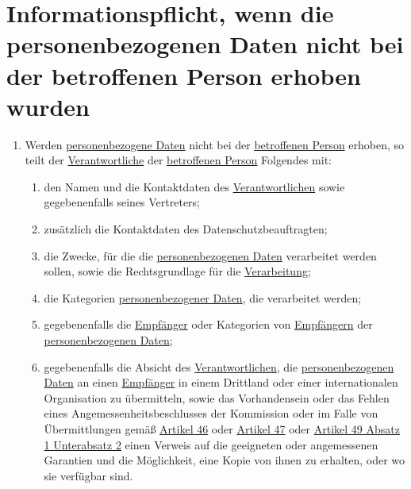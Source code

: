 \chapter{Informationspflicht, wenn die personenbezogenen Daten nicht bei der betroffenen Person erhoben wurden}
\label{ch:14}


\begin{enumerate}

  \item Werden \hyperref[itm:04-1]{personenbezogene Daten} nicht bei der \hyperref[itm:04-1]{betroffenen Person} erhoben, so teilt der \hyperref[itm:04-7]{Verantwortliche} der
   \hyperref[itm:04-1]{betroffenen Person} Folgendes mit:
  \label{itm:14-1}

  \begin{enumerate}
  
    \item den Namen und die Kontaktdaten des \hyperref[itm:04-7]{Verantwortlichen} sowie gegebenenfalls seines Vertreters;
    \label{itm:14-1a}

    \item zusätzlich die Kontaktdaten des Datenschutzbeauftragten;
    \label{itm:14-1b}

    \item die Zwecke, für die die \hyperref[itm:04-1]{personenbezogenen Daten} verarbeitet werden sollen, sowie die Rechtsgrundlage für die
     \hyperref[itm:04-2]{Verarbeitung};
    \label{itm:14-1c}

    \item die Kategorien \hyperref[itm:04-1]{personenbezogener Daten}, die verarbeitet werden;
    \label{itm:14-1d}

    \item gegebenenfalls die \hyperref[itm:04-9]{Empfänger} oder Kategorien von \hyperref[itm:04-9]{Empfängern} der \hyperref[itm:04-1]{personenbezogenen Daten};
    \label{itm:14-1e}

    \item gegebenenfalls die Absicht des \hyperref[itm:04-7]{Verantwortlichen}, die \hyperref[itm:04-1]{personenbezogenen Daten} an einen \hyperref[itm:04-9]{Empfänger} in einem
     Drittland oder einer internationalen Organisation zu übermitteln, sowie das Vorhandensein oder das Fehlen eines
     Angemessenheitsbeschlusses der Kommission oder im Falle von Übermittlungen gemäß \hyperref[ch:46]{Artikel 46} oder
     \hyperref[ch:47]{Artikel 47} oder \hyperref[itm:49-1-2]{Artikel 49 Absatz 1 Unterabsatz 2} einen Verweis auf die
      geeigneten oder angemessenen Garantien und die Möglichkeit, eine Kopie von ihnen zu erhalten, oder wo sie
      verfügbar sind.
    \label{itm:14-1f}


\end{enumerate}
\end{enumerate}
